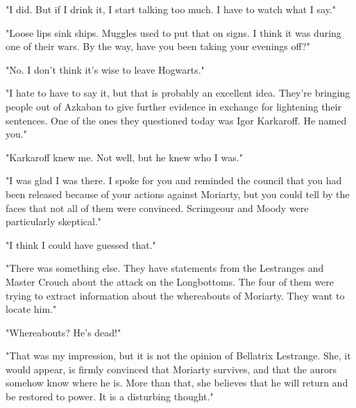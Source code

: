 \documentclass[a4paper,11pt]{article}
\begin{document}
"I did. But if I drink it, I start talking too much. I have to watch what I say."

"Loose lips sink ships. Muggles used to put that on signs. I think it was during one of their wars. By the way, have you been taking your evenings off?"

"No. I don't think it's wise to leave Hogwarts."

"I hate to have to say it, but that is probably an excellent idea. They're bringing people out of Azkaban to give further evidence in exchange for lightening their sentences. One of the ones they questioned today was Igor Karkaroff. He named you."

"Karkaroff knew me. Not well, but he knew who I was."

"I was glad I was there. I spoke for you and reminded the council that you had been released because of your actions against Moriarty, but you could tell by the faces that not all of them were convinced. Scrimgeour and Moody were particularly skeptical."

"I think I could have guessed that."

"There was something else. They have statements from the Lestranges and Master Crouch about the attack on the Longbottoms. The four of them were trying to extract information about the whereabouts of Moriarty. They want to locate him."

"Whereabouts? He's dead!"

"That was my impression, but it is not the opinion of Bellatrix Lestrange. She, it would appear, is firmly convinced that Moriarty survives, and that the aurors somehow know where he is. More than that, she believes that he will return and be restored to power. It is a disturbing thought."
\end{document}
